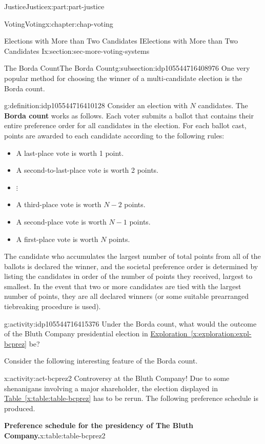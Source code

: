 \documentclass[oneside,10pt,]{book}
\newcommand{\xreffont}{\relax}
\newcommand{\terminology}[1]{\textbf{#1}}
\numberwithin{equation}{section}
\begin{document}
\begin{partptx}{Justice}{}{Justice}{}{}{x:part:part-justice}
\begin{chapterptx}{Voting}{}{Voting}{}{}{x:chapter:chap-voting}
\begin{sectionptx}{Elections with More than Two Candidates I}{}{Elections with More than Two Candidates I}{}{}{x:section:sec-more-voting-systems}
\begin{subsectionptx}{The Borda Count}{}{The Borda Count}{}{}{g:subsection:idp105544716408976}
One very popular method for choosing the winner of a multi-candidate election is the Borda count.%
\begin{definition}{}{g:definition:idp105544716410128}%
%
%
Consider an election with \(N\) candidates. The \terminology{Borda count} works as follows. Each voter submits a ballot that contains their entire preference order for all candidates in the election. For each ballot cast, points are awarded to each candidate according to the following rules:%
%
\begin{itemize}[label=\textbullet]
\item{}A last-place vote is worth 1 point.%
\item{}A second-to-last-place vote is worth 2 points.%
\item{}\(\displaystyle \vdots\)%
\item{}A third-place vote is worth \(N-2\) points.%
\item{}A second-place vote is worth \(N-1\) points.%
\item{}A first-place vote is worth \(N\) points.%
\end{itemize}
The candidate who accumulates the largest number of total points from all of the ballots is declared the winner, and the societal preference order is determined by listing the candidates in order of the number of points they received, largest to smallest. In the event that two or more candidates are tied with the largest number of points, they are all declared winners (or some suitable prearranged tiebreaking procedure is used).%
\end{definition}
\begin{activity}{}{g:activity:idp105544716415376}%
Under the Borda count, what would the outcome of the Bluth Company presidential election in \hyperref[x:exploration:expl-bcprez]{Exploration~{\xreffont\ref{x:exploration:expl-bcprez}}} be?%
\end{activity}%
Consider the following interesting feature of the Borda count.%
\begin{activity}{}{x:activity:act-bcprez2}%
Controversy at the Bluth Company! Due to some shenanigans involving a major shareholder, the election displayed in \hyperref[x:table:table-bcprez]{Table~{\xreffont\ref{x:table:table-bcprez}}} has to be rerun. The following preference schedule is produced.%
\begin{tableptx}{\textbf{Preference schedule for the presidency of The Bluth Company.}}{x:table:table-bcprez2}{}%
\centering%

\end{tableptx}
\end{activity}
\end{subsectionptx}
\end{sectionptx}
\end{chapterptx}
\end{partptx}
\end{document}
